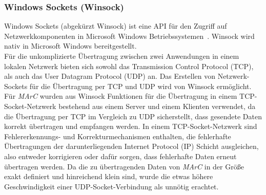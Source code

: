 \subsubsection{Windows Sockets (Winsock)}
Windows Sockets (abgekürzt Winsock) ist eine API für den Zugriff auf Netzwerkkomponenten in Microsoft Windows Betriebssystemen~\cite{quinn1998windows}. Winsock wird nativ in Microsoft Windows bereitgestellt.\\ 
Für die unkomplizierte Übertragung zwischen zwei Anwendungen in einem lokalen Netzwerk bieten sich sowohl das Transmission Control Protocol (TCP), als auch das User Datagram Protocol (UDP) an. Das Erstellen von Netzwerk-Sockets für die Übertragung per TCP und UDP wird von Winsock ermöglicht.\\ 
Für \emph{MArC} wurden aus Winsock Funktionen für die Übertragung in einem TCP-Socket-Netzwerk bestehend aus einem Server und einem Klienten verwendet, da die Übertragung per TCP im Vergleich zu UDP sicherstellt, dass gesendete Daten korrekt übertragen und empfangen werden. In einem TCP-Socket-Netzwerk sind Fehlererkennungs- und Korrekturmechanismen enthalten, die fehlerhafte Übertragungen der darunterliegenden Internet Protocol (IP) Schicht ausgleichen, also entweder korrigieren oder dafür sorgen, dass fehlerhafte Daten erneut übertragen werden. Da die zu übertragenden Daten von \emph{MArC} in der Größe exakt definiert und hinreichend klein sind, wurde die etwas höhere Geschwindigkeit einer UDP-Socket-Verbindung als unnötig erachtet.

\newpage